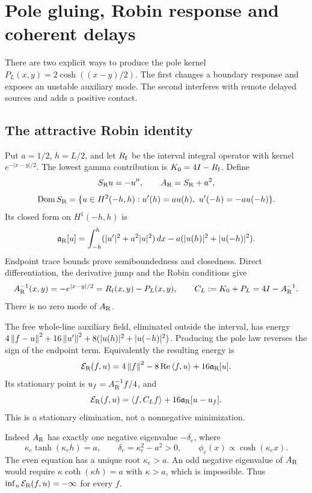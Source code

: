 \section{Pole gluing, Robin response and coherent delays}
\label{sec:poles}
There are two explicit ways to produce the pole kernel
$P_L(x,y)=2\cosh((x-y)/2)$. The first changes a boundary response
and exposes an unstable auxiliary mode. The second interferes
with remote delayed sources and adds a positive contact.

\subsection{The attractive Robin identity}
Put $a=1/2$, $h=L/2$, and let $R_{\rm f}$ be the interval integral
operator with kernel $e^{-|x-y|/2}$. The lowest gamma contribution
is $K_0=4I-R_{\rm f}$. Define
\[
S_{\rm R}u=-u'',\qquad A_{\rm R}=S_{\rm R}+a^2,
\]
\[
\operatorname{Dom} S_{\rm R}=\{u\in H^2(-h,h):
 u'(h)=au(h),\ u'(-h)=-au(-h)\}.
\]
Its closed form on $H^1(-h,h)$ is
\[
\mathfrak a_{\rm R}[u]=
 \int_{-h}^h(|u'|^2+a^2|u|^2)\,dx
 -a(|u(h)|^2+|u(-h)|^2).
\]
Endpoint trace bounds prove semiboundedness and closedness. Direct
differentiation, the derivative jump and the Robin conditions give
\begin{equation}\label{poles:robin-green}
A_{\rm R}^{-1}(x,y)=-e^{|x-y|/2}
                  =R_{\rm f}(x,y)-P_L(x,y),
\qquad
C_L:=K_0+P_L=4I-A_{\rm R}^{-1}.
\end{equation}
There is no zero mode of $A_{\rm R}$.

The free whole-line auxiliary field, eliminated outside the interval,
has energy
$4\left\lVert f-u\right\rVert^2+16\left\lVert u'\right\rVert^2+8(|u(h)|^2+|u(-h)|^2)$.
Producing the pole law reverses the sign of the endpoint term.
Equivalently the resulting energy is
\[
\mathcal E_{\rm R}(f,u)=4\left\lVert f\right\rVert^2-8\operatorname{Re}\left\langle f,u\right\rangle
                                      +16\mathfrak a_{\rm R}[u].
\]
Its stationary point is $u_f=A_{\rm R}^{-1}f/4$, and
\begin{equation}\label{poles:stationary}
\mathcal E_{\rm R}(f,u)=\left\langle f,C_Lf\right\rangle
                    +16\mathfrak a_{\rm R}[u-u_f].
\end{equation}
This is a stationary elimination, not a nonnegative minimization.

Indeed $A_{\rm R}$ has exactly one negative eigenvalue $-\delta_e$,
where
\[
\kappa_e\tanh(\kappa_e h)=a,\qquad
\delta_e=\kappa_e^2-a^2>0,\qquad
\phi_e(x)\propto\cosh(\kappa_e x).
\]
The even equation has a unique root $\kappa_e>a$. An odd negative
eigenvalue of $A_{\rm R}$ would require
$\kappa\coth(\kappa h)=a$ with $\kappa>a$, which is impossible.
Thus $\inf_u\mathcal E_{\rm R}(f,u)=-\infty$ for every $f$.

